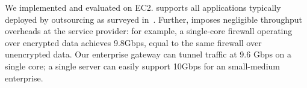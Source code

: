 We implemented and evaluated \sys on EC2. \sys supports all applications typically deployed by outsourcing as surveyed in~\cite{aplomb}.
Further, \sys imposes  negligible throughput overheads at the service provider: for example, a single-core firewall operating over encrypted data achieves 9.8Gbps, equal to the same firewall over unencrypted data.
Our enterprise gateway can tunnel traffic at 9.6 Gbps on a single core;  a single server can easily support 10Gbps for an small-medium enterprise.




